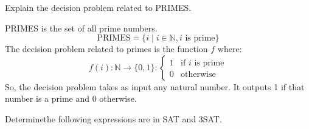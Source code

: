 \documentclass[a4paper, 12pt]{exam}
\begin{document}
\begin{questions}
\question
  Explain the decision problem related to PRIMES.
  \begin{solution}
    PRIMES is the set of all prime numbers.
      \[  \textrm{PRIMES} = \{ i \mid i \in \mathbb{N} , i \textrm{ is prime} \}  \]
    The decision problem related to primes is the function \( f \) where:
      $$ f(i):\mathbb{N} \rightarrow \{0,1\}: \left\{
            \begin{array}{ll}
              1 & \textrm{if } i \textrm{ is prime} \\
              0 & \textrm{otherwise}
            \end{array}
        \right. $$
    So, the decision problem takes as input any natural number.
    It outputs 1 if that number is a prime and 0 otherwise.
  \end{solution}


\question
  Determinethe following expressions are in SAT and 3SAT.
  \begin{solution}
\end{solution}
\end{questions}
\end{document}
